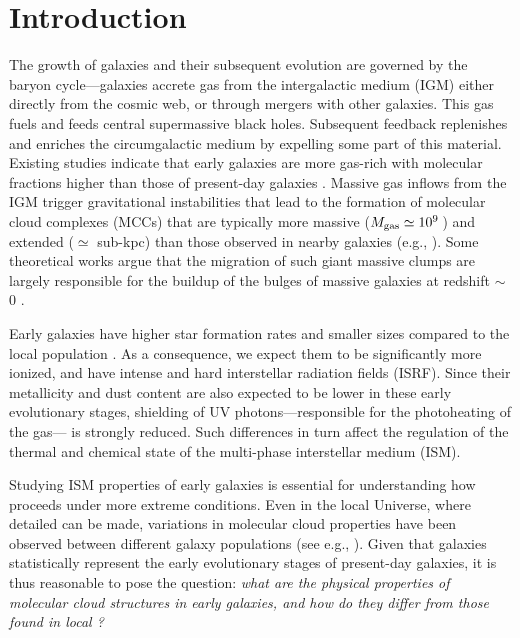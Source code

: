 \IfFileExists{emulateapjlegacy.cls}{\documentclass[iop]{emulateapjlegacy}}{\documentclass[iop]{emulateapj}}
\begin{document}

\section{Introduction}
The growth of galaxies and their subsequent evolution are governed by the baryon cycle---galaxies accrete gas from the intergalactic medium (IGM) either directly from the cosmic web, or through mergers with other galaxies. This gas fuels \SF and feeds central supermassive black holes. Subsequent feedback replenishes and enriches the circumgalactic medium by expelling some
part of this material.
%
Existing studies indicate that early galaxies are more gas-rich with molecular fractions higher than those of present-day galaxies \citep[e.g.,][]{vandevoort11b, Decarli16a, Decarli17a}. Massive gas inflows from the IGM trigger gravitational instabilities that lead to the formation of molecular cloud complexes (MCCs) that are typically more massive ($M_{\rm gas}\simeq 10^9$\,\Msun) and extended ($\simeq$ sub-kpc) than those observed in nearby galaxies (e.g., \citealt{Gabor13a, Hopkins14a, Inoue16a}). Some theoretical works argue that the migration of such giant massive clumps are largely responsible for the buildup of the bulges of massive galaxies at redshift \z$\sim$\,0 \citep[e.g.,][]{Ceverino10a}.

Early galaxies have higher star formation rates \citep[SFR; ][]{Behroozi13b, Sparre15a, Maiolino15a, Dunlop17a} and smaller sizes \citep[e.g.,][]{Bouwens11a, Ono13a} compared to the local population \citep[see also a review by][]{Stark16a}.
%
As a consequence, we expect them to be significantly more ionized, and have intense and hard interstellar radiation fields (ISRF). Since their metallicity and dust content are also expected to be lower in these early evolutionary stages, shielding of UV photons---responsible for the photoheating of the gas---  is strongly reduced. Such differences in turn affect the regulation of the thermal and chemical state of the multi-phase interstellar medium (ISM).

Studying ISM properties of early galaxies is essential for understanding how \SF proceeds under more extreme conditions.
Even in the local Universe, where detailed \obs can be made, variations in molecular cloud properties have been observed between different galaxy populations (see e.g., \citealt{Hughes10a, Hughes13b}).  Given that \highz galaxies statistically represent the early evolutionary stages of present-day galaxies, it is thus reasonable to pose the question: {\it what are the physical properties of molecular cloud structures in early galaxies, and how do they differ from those found in local \galpop?}
%
\end{document}
